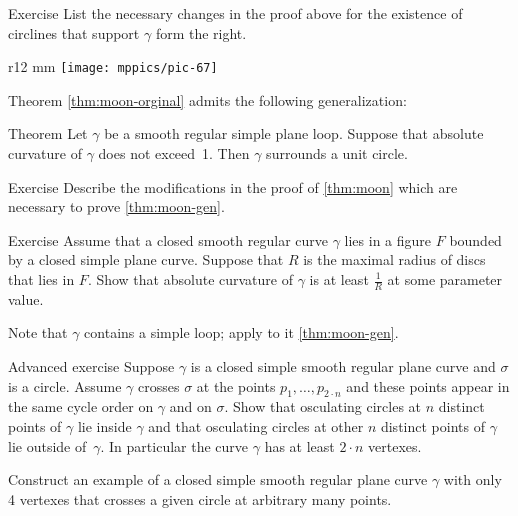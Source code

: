 \begin{thm}{Exercise}\label{ex:finish-moon}
List the necessary changes in the proof above for the existence of circlines that support $\gamma$ form the right.\qeds
\end{thm}

{

\begin{wrapfigure}{r}{12 mm}
\vskip-4mm
\centering
\texttt{[image: mppics/pic-67]}
\vskip0mm
\end{wrapfigure}

Theorem \ref{thm:moon-orginal} admits the following generalization:

\begin{thm}{Theorem}\label{thm:moon-gen}
Let $\gamma$ be a smooth regular simple plane loop.
Suppose that absolute curvature of $\gamma$ does not exceed~1.
Then $\gamma$ surrounds a unit circle.
\end{thm}

}


\begin{thm}{Exercise}\label{ex:moon-loop}
Describe the modifications in the proof of \ref{thm:moon} which are necessary to prove \ref{thm:moon-gen}.
\end{thm}

\begin{thm}{Exercise}\label{ex:moon-rad}
Assume that a closed smooth regular curve $\gamma$ lies in a figure $F$ bounded by a closed simple plane curve.
Suppose that $R$ is the maximal radius of discs that lies in $F$.
Show that absolute curvature of $\gamma$ is at least $\tfrac1R$ at some parameter value.
\end{thm}

 Note that $\gamma$ contains a simple loop; apply to it \ref{thm:moon-gen}.


\begin{thm}{Advanced exercise}
Suppose $\gamma$ is a closed simple smooth regular plane curve and $\sigma$ is a circle.
Assume $\gamma$ crosses $\sigma$ at the points $p_1,\dots,p_{2{\cdot} n}$ and these points appear in the same cycle order on $\gamma$ and on $\sigma$.
Show that osculating circles at $n$ distinct points of $\gamma$ lie inside $\gamma$ and that osculating circles at other $n$ distinct points of $\gamma$ lie outside of~$\gamma$.
In particular the curve $\gamma$ has at least $2\cdot n$ vertexes.

Construct an example of a closed simple smooth regular plane curve $\gamma$ with only 4 vertexes that crosses a given circle at arbitrary many points. 
\end{thm}

